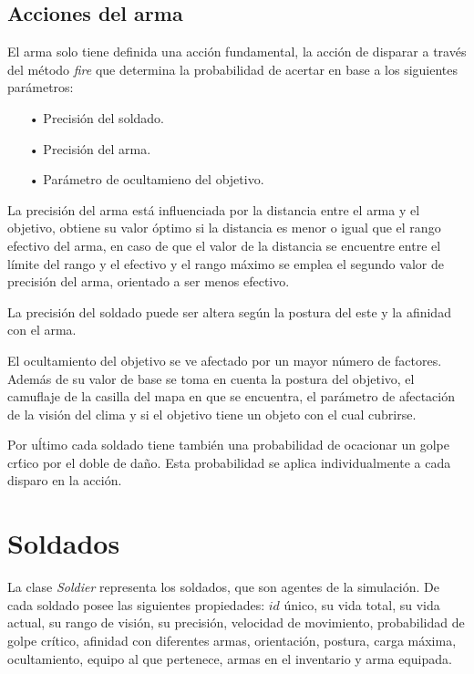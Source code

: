 \documentclass{llncs}
\begin{document}
\subsection{Acciones del arma}

El arma solo tiene definida una acci\'on fundamental, la acci\'on de disparar a trav\'es del m\'etodo \emph{fire} que determina la probabilidad de acertar en base a los siguientes par\'ametros:

\begin{itemize}
\item[•] Precisi\'on del soldado.
\item[•] Precisi\'on del arma.
\item[•] Par\'ametro de ocultamieno del objetivo.
\end{itemize}

La precisi\'on del arma est\'a influenciada por la distancia entre el arma y el objetivo, obtiene su valor \'optimo si la distancia es menor o igual que el rango efectivo del arma, en caso de que el valor de la distancia se encuentre entre el l\'imite del rango y el efectivo y el rango m\'aximo se emplea el segundo valor de precisi\'on del arma, orientado a ser menos efectivo.

La precisi\'on del soldado puede ser altera seg\'un la postura del este y la afinidad con el arma.

El ocultamiento del objetivo se ve afectado por un mayor n\'umero de factores. Adem\'as de su valor de base se toma en cuenta la postura del objetivo, el camuflaje de la casilla del mapa en que se encuentra, el par\'ametro de afectaci\'on de la visi\'on del clima y si el objetivo tiene un objeto con el cual cubrirse.

Por u\'ltimo cada soldado tiene tambi\'en una probabilidad de ocacionar un golpe cr\'tico por el doble de da\~no. Esta probabilidad se aplica individualmente a cada disparo en la acci\'on.

\section{Soldados}

La clase \emph{Soldier} representa los soldados, que son agentes de la simulaci\'on. De cada soldado posee las siguientes propiedades: $id$ \'unico, su vida total, su vida actual, su rango de visi\'on, su precisi\'on, velocidad de movimiento, probabilidad de golpe cr\'itico, afinidad con diferentes armas, orientaci\'on, postura, carga m\'axima, ocultamiento, equipo al que pertenece, armas en el inventario y arma equipada.
\end{document}
